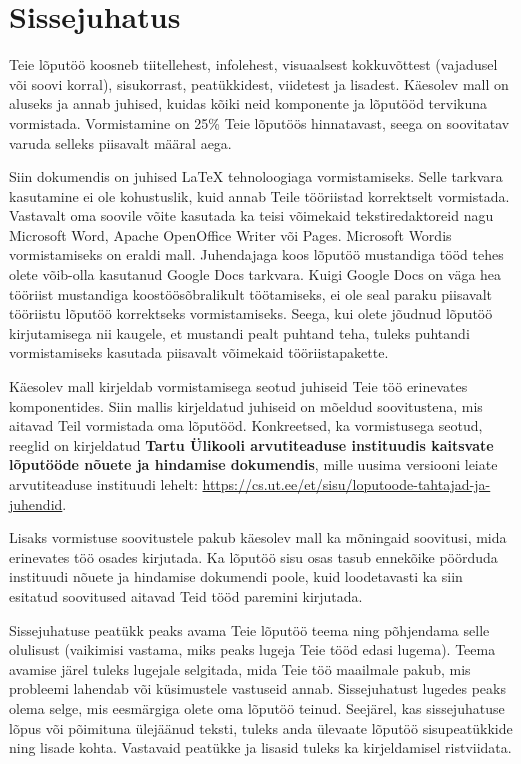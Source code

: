 \section{Sissejuhatus} \label{sissejuhatus}

Teie lõputöö koosneb tiitellehest, infolehest, visuaalsest kokkuvõttest (vajadusel või soovi korral), sisukorrast, peatükkidest, viidetest ja lisadest. Käesolev mall on aluseks ja annab juhised, kuidas kõiki neid komponente ja lõputööd tervikuna vormistada. Vormistamine on 25\% Teie lõputöös hinnatavast, seega on soovitatav varuda selleks piisavalt määral aega.

Siin dokumendis on juhised LaTeX tehnoloogiaga vormistamiseks. Selle tarkvara kasutamine ei ole kohustuslik, kuid annab Teile tööriistad korrektselt vormistada. Vastavalt oma soovile võite kasutada ka teisi võimekaid tekstiredaktoreid nagu Microsoft Word, Apache OpenOffice Writer või Pages. Microsoft Wordis vormistamiseks on eraldi mall. Juhendajaga koos lõputöö mustandiga tööd tehes olete võib-olla kasutanud Google Docs tarkvara. Kuigi Google Docs on väga hea tööriist mustandiga koostöösõbralikult töötamiseks, ei ole seal paraku piisavalt tööriistu lõputöö korrektseks vormistamiseks. Seega, kui olete jõudnud lõputöö kirjutamisega nii kaugele, et mustandi pealt puhtand teha, tuleks puhtandi vormistamiseks kasutada piisavalt võimekaid tööriistapakette.

Käesolev mall kirjeldab vormistamisega seotud juhiseid Teie töö erinevates komponentides. Siin mallis kirjeldatud juhiseid on mõeldud soovitustena, mis aitavad Teil vormistada oma lõputööd. Konkreetsed, ka vormistusega seotud, reeglid on kirjeldatud \textbf{Tartu Ülikooli arvutiteaduse instituudis kaitsvate lõputööde nõuete ja hindamise dokumendis}, mille uusima versiooni leiate arvutiteaduse instituudi lehelt: \url{https://cs.ut.ee/et/sisu/loputoode-tahtajad-ja-juhendid}.

Lisaks vormistuse soovitustele pakub käesolev mall ka mõningaid soovitusi, mida erinevates töö osades kirjutada. Ka lõputöö sisu osas tasub ennekõike pöörduda instituudi nõuete ja hindamise dokumendi poole, kuid loodetavasti ka siin esitatud soovitused aitavad Teid tööd paremini kirjutada.

Sissejuhatuse peatükk peaks avama Teie lõputöö teema ning põhjendama selle olulisust (vaikimisi vastama, miks peaks lugeja Teie tööd edasi lugema). Teema avamise järel tuleks lugejale selgitada, mida Teie töö maailmale pakub, mis probleemi lahendab või küsimustele vastuseid annab. Sissejuhatust lugedes peaks olema selge, mis eesmärgiga olete oma lõputöö teinud. Seejärel, kas sissejuhatuse lõpus või põimituna ülejäänud teksti, tuleks anda ülevaate lõputöö sisupeatükkide ning lisade kohta. Vastavaid peatükke ja lisasid tuleks ka kirjeldamisel ristviidata.

